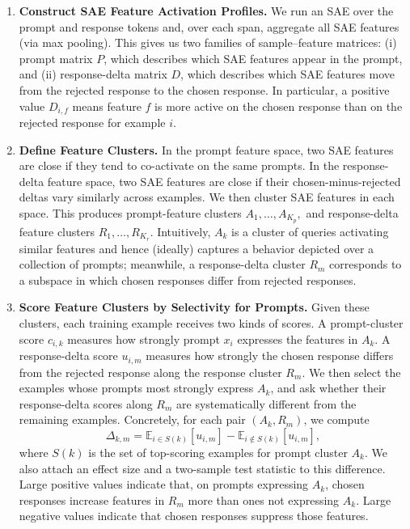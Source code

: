\documentclass{article} %
\begin{document}
\begin{enumerate}[leftmargin=*]
    \item \textbf{Construct SAE Feature Activation Profiles.} We run an SAE over the prompt and response tokens and, over each span, aggregate all SAE features (via max pooling). 
    This gives us two families of sample--feature matrices: (i) prompt matrix $P$, which describes which SAE features appear in the prompt, and (ii) response-delta matrix $D$, which describes which SAE features move from the rejected response to the chosen response. 
    In particular, a positive value $D_{i,f}$ means feature $f$ is more active on the chosen response than on the rejected response for example $i$.

    \item \textbf{Define Feature Clusters.}
    In the prompt feature space, two SAE features are close if they tend to co-activate on the same prompts. 
    In the response-delta feature space, two SAE features are close if their chosen-minus-rejected deltas vary similarly across examples.
    We then cluster SAE features in each space. 
    This produces prompt-feature clusters $A_1,\ldots,A_{K_p},$ and response-delta feature clusters $R_1,\ldots,R_{K_r}$.
    Intuitively, $A_k$ is a cluster of queries activating similar features and hence (ideally) captures a behavior depicted over a collection of prompts; meanwhile, a response-delta cluster $R_m$ corresponds to a subspace in which chosen responses differ from rejected responses.

    \item \textbf{Score Feature Clusters by Selectivity for Prompts.} 
    Given these clusters, each training example receives two kinds of scores. 
    A prompt-cluster score $c_{i,k}$ measures how strongly prompt $x_i$ expresses the features in $A_k$. 
    A response-delta score $u_{i,m}$ measures how strongly the chosen response differs from the rejected response along the response cluster $R_m$.
    We then select the examples whose prompts most strongly express $A_k$, and ask whether their response-delta scores along $R_m$ are systematically different from the remaining examples. 
    Concretely, for each pair $(A_k,R_m)$, we compute
    \begin{equation}
    \Delta_{k,m} = \mathbb{E}_{i \in S(k)}[u_{i,m}] - \mathbb{E}_{i \notin S(k)}[u_{i,m}],
    \label{eq:prompt-response-delta}
    \end{equation}
    where $S(k)$ is the set of top-scoring examples for prompt cluster $A_k$. 
    We also attach an effect size and a two-sample test statistic to this difference. 
    Large positive values indicate that, on prompts expressing $A_k$, chosen responses increase features in $R_m$ more than ones not expressing $A_k$. 
    Large negative values indicate that chosen responses suppress those features.


\end{enumerate}
\end{document}
